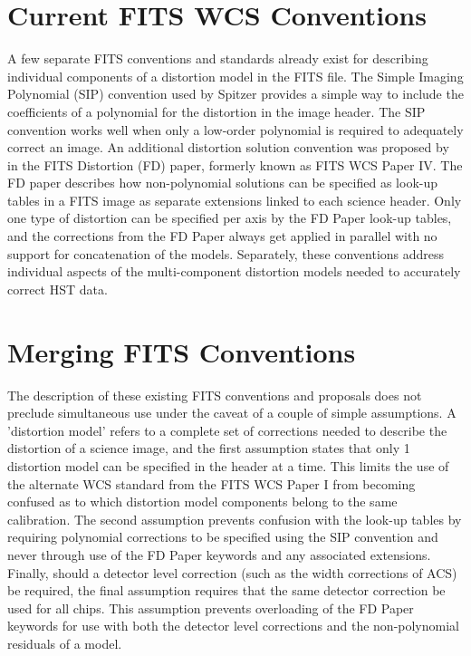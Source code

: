 \section{Current FITS WCS Conventions}
A few separate FITS conventions and standards already exist for describing individual components of a distortion model in the FITS file. The Simple Imaging Polynomial (SIP)\citep{shupe_2005} convention used by Spitzer provides a simple way to include the coefficients of a polynomial for the distortion in the image header. The SIP convention works well when only a low-order polynomial is required to adequately correct an image. An additional distortion solution convention was proposed by \citet{Calabretta2012} in the FITS Distortion (FD) paper, formerly known as FITS WCS Paper IV. The FD paper describes how non-polynomial solutions can be specified as look-up tables in a FITS image as separate extensions linked to each science header.  Only one type of distortion can be specified per axis by the FD Paper look-up tables, and the corrections from the FD Paper always get applied in parallel with no support for concatenation of the models.  Separately, these conventions address individual aspects of the multi-component distortion models needed to accurately correct HST data.

\section{Merging FITS Conventions}
The description of these existing FITS conventions and proposals does not preclude simultaneous use under the caveat of a couple of simple assumptions.  A 'distortion model' refers to a complete set of corrections needed to describe the distortion of a science image, and the first assumption states that only 1 distortion model can be specified in the header at a time. This limits the use of the alternate WCS standard from the FITS WCS Paper I from becoming confused as to which distortion model components belong to the same calibration. The second assumption prevents confusion with the look-up tables by requiring polynomial corrections to be specified using the SIP convention and never through use of the FD Paper keywords and any associated extensions. Finally, should a detector level correction (such as the width corrections of ACS) be required, the final assumption requires that the same detector correction be used for all chips. This assumption prevents overloading of the FD Paper keywords for use with both the detector level corrections and the non-polynomial residuals of a model. 

